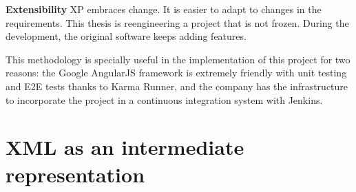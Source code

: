 \textbf{Extensibility} \ac{XP} embraces change. 
It is easier to adapt to changes in the requirements. 
This thesis is reengineering a project that is not frozen. 
During the development, the original software keeps adding features.

This methodology is specially useful in the implementation of this project for two reasons: 
the Google AngularJS framework is extremely friendly with unit testing and \ac{E2E} tests thanks to Karma Runner, and the company has the infrastructure to incorporate the project in a continuous integration system with Jenkins.

\section{XML as an intermediate representation}


